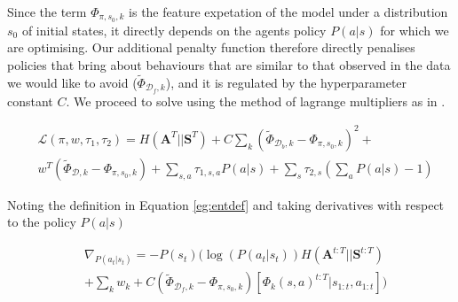 \documentclass[letterpaper]{article}
\begin{document}
Since the term $\Phi_{\pi,s_0,k}$ is the feature expetation of the model under a distribution $s_0$ of initial states, it directly depends on the agents policy $P(a|s)$ for which we are optimising. Our additional penalty function therefore directly penalises policies that bring about behaviours that are similar to that observed in the data we would like to avoid ($\widetilde{\Phi}_{\mathcal{D}_f,k}$), and it is regulated by the hyperparameter constant $C$. We proceed to solve using the method of lagrange multipliers as in \cite{ziebart2010modelingthesis}. 

\begin{equation}
	\begin{split}
	&\mathcal{L}(\pi,w,\tau_1,\tau_2) = H(\mathbf{A}^T||\mathbf{S}^T) +C\sum_k(\widetilde{\Phi}_{\mathcal{D}_b,k}-\Phi_{\pi,s_0,k})^2 +\\
	& {w}^T(\widetilde{\Phi}_{\mathcal{D},k}-\Phi_{\pi,s_0,k}) + \sum_{s,a}\tau_{1,s,a} P(a|s) + \sum_s\tau_{2,s} (\sum_aP(a|s)-1)
	\end{split}
\end{equation}

Noting the definition in Equation \ref{eg:entdef} and taking derivatives with respect to the policy $P(a|s)$

\begin{equation}
 \begin{split}
 &\nabla_{P(a_t|s_t)}=  - P(s_{t}) \Big(\log(P(a_t|s_t))H(\mathbf{A}^{t:T}||\mathbf{S}^{t:T})\\
 & +\sum_k w_k + C(\widetilde{\Phi}_{\mathcal{D}_f,k}-\Phi_{\pi,s_0,k}) [\Phi_k(s,a)^{t:T}|s_{1:t},a_{1:t}]\Big) \label{eqn:der1}
 \end{split}
\end{equation}
\end{document}
